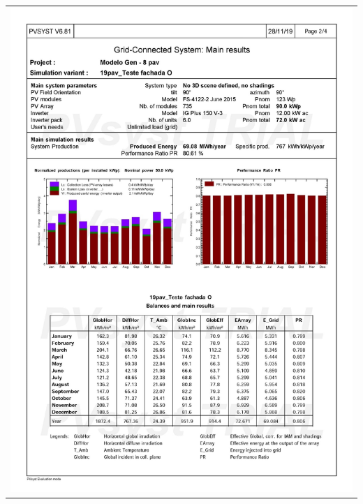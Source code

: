\begin{table}[H]
    \centering
    \begin{tabular}{l}
        \includegraphics[width=\textwidth]{figures/attachments/resultpv28.jpg}
    \end{tabular}
\end{table}
\pagebreak

